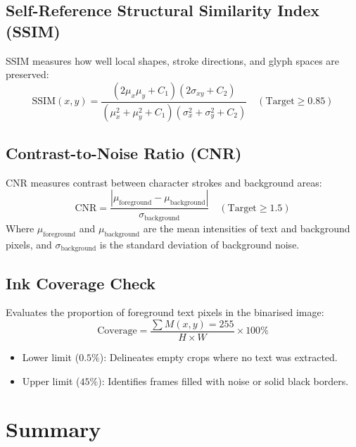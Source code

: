 \subsection{Self-Reference Structural Similarity Index (SSIM)}
SSIM measures how well local shapes, stroke directions, and glyph spaces are preserved:
\begin{equation}
\text{SSIM}(x, y) = \frac{(2\mu_x\mu_y + C_1)(2\sigma_{xy} + C_2)}{(\mu_x^2 + \mu_y^2 + C_1)(\sigma_x^2 + \sigma_y^2 + C_2)} \quad (\text{Target} \ge 0.85)
\end{equation}

\subsection{Contrast-to-Noise Ratio (CNR)}
CNR measures contrast between character strokes and background areas:
\begin{equation}
\text{CNR} = \frac{|\mu_{\text{foreground}} - \mu_{\text{background}}|}{\sigma_{\text{background}}} \quad (\text{Target} \ge 1.5)
\end{equation}
Where $\mu_{\text{foreground}}$ and $\mu_{\text{background}}$ are the mean intensities of text and background pixels, and $\sigma_{\text{background}}$ is the standard deviation of background noise.

\subsection{Ink Coverage Check}
Evaluates the proportion of foreground text pixels in the binarised image:
\begin{equation}
\text{Coverage} = \frac{\sum M(x, y) = 255}{H \times W} \times 100\%
\end{equation}
\begin{itemize}
	\item Lower limit ($0.5\%$): Delineates empty crops where no text was extracted.
	\item Upper limit ($45\%$): Identifies frames filled with noise or solid black borders.
\end{itemize}

\section{Summary}

